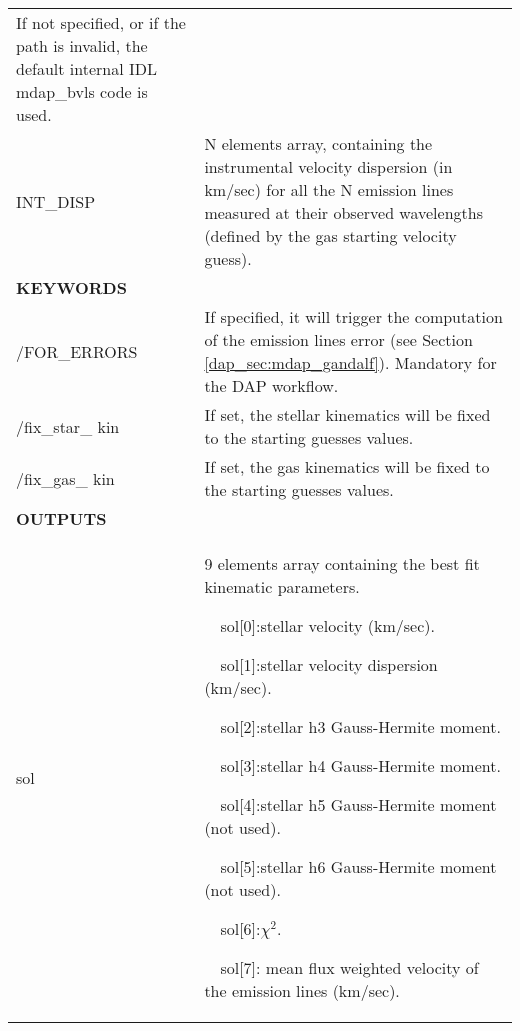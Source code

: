 \begin{center}
\begin{longtable}{p{2.7cm}| p{11.1cm}}
                  If not specified, or if the path is invalid, the default internal IDL mdap\_bvls code is used. \\
% 
INT\_DISP    &N elements array, containing the instrumental velocity dispersion (in km/sec) for all the N emission lines
               measured at their observed wavelengths (defined by the gas starting velocity guess). \\
\hline
{\bf KEYWORDS}  & \\
/FOR\_ERRORS    & If specified, it will trigger the computation of the emission lines error
                  (see Section \ref{dap_sec:mdap_gandalf}). Mandatory for the DAP workflow.\\
%
/fix\_star\_ kin & If set, the stellar kinematics will be fixed to the starting guesses values.\\
%
/fix\_gas\_ kin & If set, the gas kinematics will be fixed to the starting guesses values.\\
%
\hline
{\bf  OUTPUTS} &  \\
\hline
sol &  9 elements array containing the best fit kinematic parameters. 

       \ \ sol[0]:stellar velocity (km/sec).

       \ \ sol[1]:stellar velocity dispersion  (km/sec).

       \ \ sol[2]:stellar h3 Gauss-Hermite moment.

       \ \ sol[3]:stellar h4 Gauss-Hermite moment.

       \ \ sol[4]:stellar h5 Gauss-Hermite moment (not used).

       \ \ sol[5]:stellar h6 Gauss-Hermite moment (not used).

       \ \ sol[6]:$\chi^2$.

       \ \ sol[7]: mean flux weighted velocity of the emission lines (km/sec).


\end{longtable}
\end{center}
